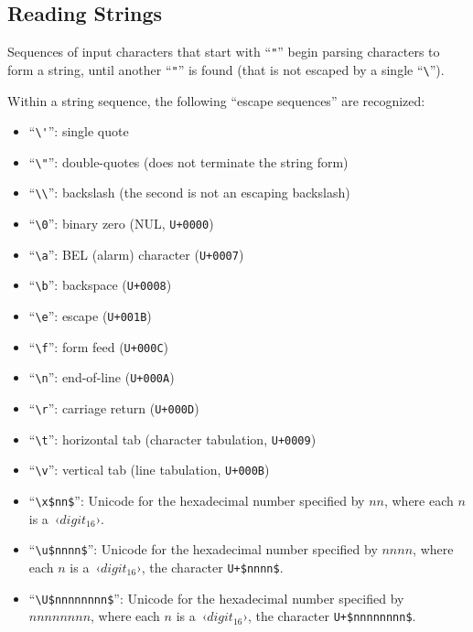 \subsection{Reading Strings}
\label{subsec:aml-base-lang-reader-strings}

Sequences of input characters that start with ``\lstinline!"!'' begin parsing characters to form a string, until another ``\lstinline!"!'' is found (that is not escaped by a single ``\lstinline!\!''). %

Within a string sequence, the following ``escape sequences'' are recognized:

\begin{itemize}
  \item ``\lstinline!\'!'': single quote
  \item ``\lstinline!\"!'': double-quotes (does not terminate the string form)
  \item ``\lstinline!\\!'': backslash (the second is not an escaping backslash)
  \item ``\lstinline!\0!'': binary zero (NUL, \lstinline!U+0000!)
  \item ``\lstinline!\a!'': BEL (alarm) character (\lstinline!U+0007!)
  \item ``\lstinline!\b!'': backspace (\lstinline!U+0008!)
  \item ``\lstinline!\e!'': escape (\lstinline!U+001B!)
  \item ``\lstinline!\f!'': form feed (\lstinline!U+000C!)
  \item ``\lstinline!\n!'': end-of-line (\lstinline!U+000A!)
  \item ``\lstinline!\r!'': carriage return (\lstinline!U+000D!)
  \item ``\lstinline!\t!'': horizontal tab (character tabulation, \lstinline!U+0009!)
  \item ``\lstinline!\v!'': vertical tab (line tabulation, \lstinline!U+000B!)
  
  \item ``\lstinline!\x$nn$!'': Unicode for the hexadecimal number specified by $nn$, where each $n$ is a~‹$digit_{16}$›.
  \item ``\lstinline!\u$nnnn$!'': Unicode for the hexadecimal number specified by $nnnn$, where each $n$ is a~‹$digit_{16}$›, the character \lstinline!U+$nnnn$!.
  \item ``\lstinline!\U$nnnnnnnn$!'': Unicode for the hexadecimal number specified by $nnnnnnnn$, where each $n$ is a~‹$digit_{16}$›, the character \lstinline!U+$nnnnnnnn$!.
  

\end{itemize}
